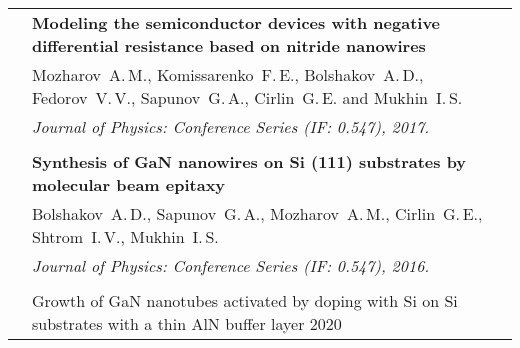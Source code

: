 \documentclass[letterpaper, 11pt]{article}
\begin{document}
\begin{longtable}{p{1.3in}p{4.8in}}
        & \textbf{Modeling the semiconductor devices with negative differential
        resistance based on nitride nanowires} \\
        & Mozharov~A.\,M., Komissarenko~F.\,E., Bolshakov~A.\,D.,
        Fedorov~V.\,V., Sapunov~G.\,A., Cirlin~G.\,E. and Mukhin~I.\,S. \\
		& \textit{Journal of Physics: Conference Series (IF: 0.547), 2017.}\\
		& \\

        & \textbf{Synthesis of GaN nanowires on Si (111) substrates by
        molecular beam epitaxy} \\
        & Bolshakov~A.\,D., Sapunov~G.\,A., Mozharov~A.\,M., Cirlin~G.\,E.,
        Shtrom~I.\,V., Mukhin~I.\,S. \\
        & \textit{Journal of Physics: Conference Series (IF: 0.547), 2016.}\\
		& \\

		{\color{OliveGreen}{Patent}}
        & Growth of GaN nanotubes activated by doping with Si on Si substrates
        with a thin AlN buffer layer \hfill 2020\\
		
		
		
		
	\end{longtable}
\end{document}

